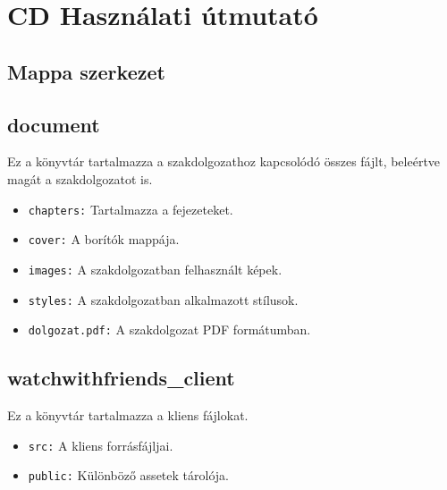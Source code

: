 \pagestyle{empty}

\section*{CD Használati útmutató}

\subsection*{Mappa szerkezet}
\vspace{2em}
\subsection*{document}
Ez a könyvtár tartalmazza a szakdolgozathoz kapcsolódó összes fájlt, beleértve magát a szakdolgozatot is.

\begin{itemize}
\item \texttt{chapters:} Tartalmazza a fejezeteket.
\item \texttt{cover:} A borítók mappája.
\item \texttt{images:} A szakdolgozatban felhasznált képek.
\item \texttt{styles:} A szakdolgozatban alkalmazott stílusok.
\item \texttt{dolgozat.pdf:} A szakdolgozat PDF formátumban.
\end{itemize}

\subsection*{watchwithfriends\_client}
Ez a könyvtár tartalmazza a kliens fájlokat.

\begin{itemize}
\item \texttt{src:} A kliens forrásfájljai.
\item \texttt{public:} Különböző assetek tárolója.
\end{itemize}

